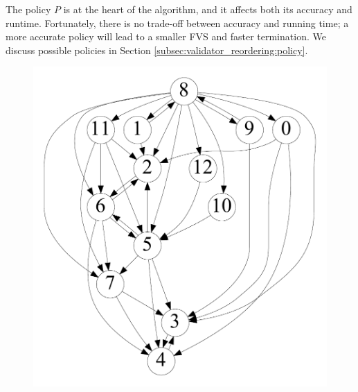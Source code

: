 The policy $P$ is at the heart of the algorithm, and it affects both its accuracy and runtime. Fortunately, there is no trade-off between accuracy and running time; a more accurate policy will lead to a smaller FVS and faster termination. We discuss possible policies in Section \ref{subsec:validator_reordering:policy}.

\begin{figure}[t]
	\centering
	\begin{minipage}[b]{0.19\linewidth}
		\captionsetup{type=figure}
		\centering
		{\includegraphics[width=\textwidth]{./alg_fig/scc-g0}}
	\end{minipage}
	\begin{minipage}[b]{0.19\linewidth}
		\centering

\end{minipage}
\end{figure}
